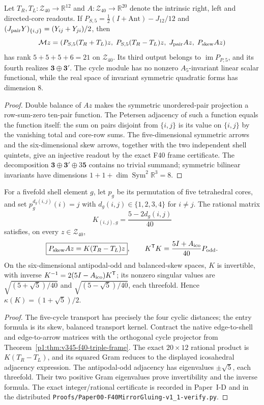 \documentclass[11pt]{article}
\begin{document}
\begin{proposition}
\label{p1:prop:v349-f40-reduced-frame}
Let $T_R,T_L:\mathcal Z_{40}\to\mathbb R^{12}$ and
$A:\mathcal Z_{40}\to\mathbb R^{20}$ denote the intrinsic
right, left and directed-core readouts.  If $P_{S,5}=
\frac12(I+\mathrm{Ant})-J_{12}/12$ and
$(J_{\rm pair}Y)_{\{i,j\}}=(Y_{ij}+Y_{ji})/2$, then
\[
 \mathcal Mz=\left(P_{S,5}(T_R+T_L)z,\;
 P_{S,5}(T_R-T_L)z,\;J_{\rm pair}Az,\;P_{\rm skew}Az\right)
\]
has rank $5+5+5+6=21$ on $\mathcal Z_{40}$.  Its third output
belongs to $\operatorname{im}P_{P,5}$, and its fourth realizes
$\mathbf3\oplus\mathbf3'$.  The cycle module has no nonzero
$A_5$-invariant linear scalar functional, while the real space of
invariant symmetric quadratic forms has dimension $8$.
\end{proposition}
\begin{proof}
Double balance of $Az$ makes the symmetric unordered-pair
projection a row-sum-zero ten-pair function.  The Petersen
adjacency of such a function equals the function itself: the sum
on pairs disjoint from $\{i,j\}$ is its value on $\{i,j\}$ by
the vanishing total and core-row sums.  The five-dimensional
symmetric arrows and the six-dimensional skew arrows, together
with the two independent shell quintets, give an injective
readout by the exact F40 frame certificate.  The decomposition
$\mathbf3\oplus\mathbf3'\oplus3\mathbf5$ contains no trivial
summand; symmetric bilinear invariants have dimensions
$1+1+\dim\operatorname{Sym}^2\mathbb R^3=8$.
\end{proof}

\begin{theorem}
\label{p1:thm:v349-f40-mirror-gluing}
For a fivefold shell element $g$, let $p_g$ be its permutation of
five tetrahedral cores, and set $p_g^{d_g(i,j)}(i)=j$ with
$d_g(i,j)\in\{1,2,3,4\}$ for $i\ne j$.  The rational matrix
\[
 K_{(i,j),g}=\frac{5-2d_g(i,j)}{40}
\]
satisfies, on every $z\in\mathcal Z_{40}$,
\[
 \boxed{P_{\rm skew}Az=K(T_R-T_L)z},\qquad
 K^{\mathsf T}K=\frac{5I+A_{\rm ico}}{40}P_{\rm odd}.
\]
On the six-dimensional antipodal-odd and balanced-skew spaces,
$K$ is invertible, with inverse
$K^{-1}=2(5I-A_{\rm ico})K^{\mathsf T}$; its nonzero singular
values are $\sqrt{(5+\sqrt5)/40}$ and
$\sqrt{(5-\sqrt5)/40}$, each threefold.  Hence
$\kappa(K)=(1+\sqrt5)/2$.
\end{theorem}
\begin{proof}
The five-cycle transport has precisely the four cyclic
distances; the entry formula is its skew, balanced transport
kernel.  Contract the native edge-to-shell and edge-to-arrow
matrices with the orthogonal cycle projector from
Theorem~\ref{p1:thm:v345-f40-triple-frame}.  The exact
$20\times12$ rational product is $K(T_R-T_L)$, and its squared
Gram reduces to the displayed icosahedral adjacency expression.
The antipodal-odd adjacency has eigenvalues $\pm\sqrt5$,
each threefold.  Their two positive Gram eigenvalues prove
invertibility and the inverse formula.  The exact integer/rational
certificate is recorded in Paper~I-D and in the distributed
\texttt{Proofs/Paper00-F40MirrorGluing-v1\_1-verify.py}.
\end{proof}
\end{document}
